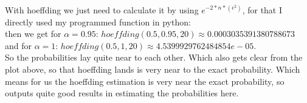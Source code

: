 With hoeffding we just need to calculate it by using $e^{-2 * n * (\epsilon^2)}$, for that I directly used my programmed function in python:\\
then we get for $\alpha = 0.95$: $hoeffding(0.5,0.95,20) \approx 0.0003035391380788673$\\
and for $\alpha = 1$: $hoeffding(0.5,1,20) \approx 4.5399929762484854e-05$.\\
So the probabilities lay quite near to each other. Which also gets clear from the plot above, so that hoeffding lands is very near to the exact probability.
Which means for us the hoeffding estimation is very near the exact probability, so outputs quite good results in estimating the probabilities here.
